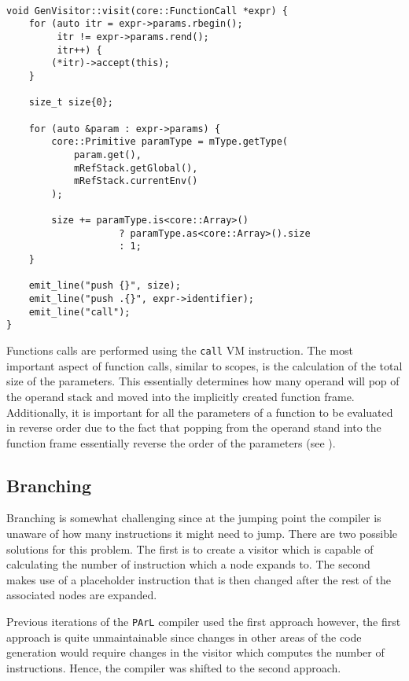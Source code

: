 \begin{lstlisting}[caption={The \texttt{visit(FunctionCall *)}
method in the \texttt{GenVisitor} class
(ir\_gen/GenVisitor.cpp)}, label=lst:funccall]

void GenVisitor::visit(core::FunctionCall *expr) {
    for (auto itr = expr->params.rbegin();
         itr != expr->params.rend();
         itr++) {
        (*itr)->accept(this);
    }

    size_t size{0};

    for (auto &param : expr->params) {
        core::Primitive paramType = mType.getType(
            param.get(),
            mRefStack.getGlobal(),
            mRefStack.currentEnv()
        );

        size += paramType.is<core::Array>()
                    ? paramType.as<core::Array>().size
                    : 1;
    }

    emit_line("push {}", size);
    emit_line("push .{}", expr->identifier);
    emit_line("call");
}
\end{lstlisting}

Functions calls are performed using the \texttt{call} VM
instruction. The most important aspect of function calls,
similar to scopes, is the calculation of the total size of the
parameters. This essentially determines how many operand will
pop of the operand stack and moved into the implicitly created
function frame. Additionally, it is important for all the
parameters of a function to be evaluated in reverse order due to
the fact that popping from the operand stand into the function
frame essentially reverse the order of the parameters (see
).

\subsection{Branching}

Branching is somewhat challenging since at the jumping point the
compiler is unaware of how many instructions it might need to
jump. There are two possible solutions for this problem. The
first is to create a visitor which is capable of calculating the
number of instruction which a node expands to. The second makes
use of a placeholder instruction that is then changed after the
rest of the associated nodes are expanded.

Previous iterations of the \texttt{PArL} compiler used the first
approach however, the first approach is quite unmaintainable
since changes in other areas of the code generation would
require changes in the visitor which computes the number of
instructions. Hence, the compiler was shifted
to the second approach.

